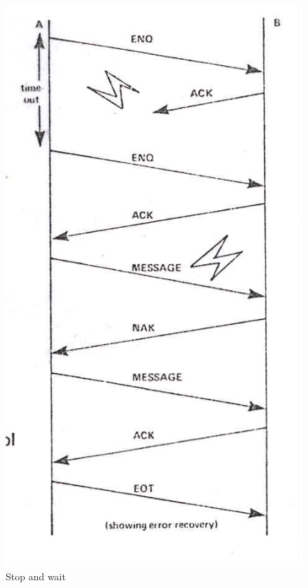 \begin{figure}[H]
    \centering
    \begin{minipage}[t]{0.3\linewidth}
        \centering
        \includegraphics[width=\linewidth]{img/stop_and_wait.png}
        \caption{Stop and wait}
    \end{minipage}
    \begin{minipage}[b]{0.6\linewidth}

\end{minipage}
\end{figure}
